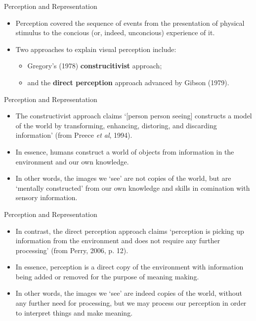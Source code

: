 \begin{frame}{Perception and Representation}
	\begin{itemize}
		\item Perception covered the sequence of events from the presentation of physical stimulus to the concious (or, indeed, unconcious)
		experience of it.
		\item Two approaches to explain visual perception include:
		\begin{itemize}
			\item Gregory's (1978) \textbf{construcitivist} approach;
			\item and the \textbf{direct perception} approach advanced by Gibson (1979).
		\end{itemize}
	\end{itemize}
\end{frame}

\begin{frame}{Perception and Representation}
	\begin{itemize}
		\item The constructivist approach claims `[person person seeing] constructs a model of the world by transforming, enhancing, distoring, and discarding
		information' (from Preece \textit{et al}, 1994).
		\item In essence, humans construct a world of objects from information in the environment and our own knowledge.
		\item In other words, the images we `see' are not copies of the world, but are `mentally constructed' from our own knowledge and skills in 
		comination with sensory information.
	\end{itemize}
\end{frame}

\begin{frame}{Perception and Representation}
	\begin{itemize}
		\item In contrast, the direct perception approach claims `perception is picking up information from the environment and does not require any
		further processing' (from Perry, 2006, p. 12).
		\item In essence, perception is a direct copy of the environment with information being added or removed for the purpose of meaning making.
		\item In other words, the images we `see' are indeed copies of the world, without any further need for processing, but we may process our perception
		in order to interpret things and make meaning.
	\end{itemize}
\end{frame}

